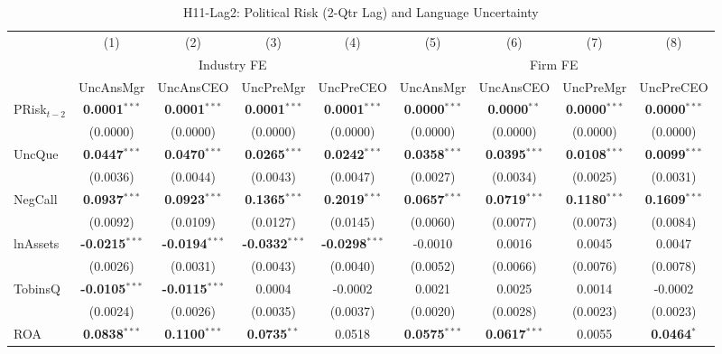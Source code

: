 \documentclass[11pt,a4paper]{article}
\begin{document}
\clearpage
\begin{table}[htbp]
\centering
\caption{H11-Lag2: Political Risk (2-Qtr Lag) and Language Uncertainty}
\label{tab:h11_lag2}
\scriptsize
\begin{tabular}{lcccccccc}
\toprule
 & (1) & (2) & (3) & (4) & (5) & (6) & (7) & (8) \\
 & \multicolumn{4}{c}{Industry FE} & \multicolumn{4}{c}{Firm FE} \\
\cmidrule(lr){2-5} \cmidrule(lr){6-9}
 & UncAnsMgr & UncAnsCEO & UncPreMgr & UncPreCEO & UncAnsMgr & UncAnsCEO & UncPreMgr & UncPreCEO \\
\midrule
PRisk$_{t-2}$ & \textbf{0.0001}$^{***}$ & \textbf{0.0001}$^{***}$ & \textbf{0.0001}$^{***}$ & \textbf{0.0001}$^{***}$ & \textbf{0.0000}$^{***}$ & \textbf{0.0000}$^{**}$ & \textbf{0.0000}$^{***}$ & \textbf{0.0000}$^{***}$ \\
 & (0.0000) & (0.0000) & (0.0000) & (0.0000) & (0.0000) & (0.0000) & (0.0000) & (0.0000) \\
\midrule
UncQue & \textbf{0.0447}$^{***}$ & \textbf{0.0470}$^{***}$ & \textbf{0.0265}$^{***}$ & \textbf{0.0242}$^{***}$ & \textbf{0.0358}$^{***}$ & \textbf{0.0395}$^{***}$ & \textbf{0.0108}$^{***}$ & \textbf{0.0099}$^{***}$ \\
 & (0.0036) & (0.0044) & (0.0043) & (0.0047) & (0.0027) & (0.0034) & (0.0025) & (0.0031) \\
NegCall & \textbf{0.0937}$^{***}$ & \textbf{0.0923}$^{***}$ & \textbf{0.1365}$^{***}$ & \textbf{0.2019}$^{***}$ & \textbf{0.0657}$^{***}$ & \textbf{0.0719}$^{***}$ & \textbf{0.1180}$^{***}$ & \textbf{0.1609}$^{***}$ \\
 & (0.0092) & (0.0109) & (0.0127) & (0.0145) & (0.0060) & (0.0077) & (0.0073) & (0.0084) \\
lnAssets & \textbf{-0.0215}$^{***}$ & \textbf{-0.0194}$^{***}$ & \textbf{-0.0332}$^{***}$ & \textbf{-0.0298}$^{***}$ & -0.0010 & 0.0016 & 0.0045 & 0.0047 \\
 & (0.0026) & (0.0031) & (0.0043) & (0.0040) & (0.0052) & (0.0066) & (0.0076) & (0.0078) \\
TobinsQ & \textbf{-0.0105}$^{***}$ & \textbf{-0.0115}$^{***}$ & 0.0004 & -0.0002 & 0.0021 & 0.0025 & 0.0014 & -0.0002 \\
 & (0.0024) & (0.0026) & (0.0035) & (0.0037) & (0.0020) & (0.0028) & (0.0023) & (0.0023) \\
ROA & \textbf{0.0838}$^{***}$ & \textbf{0.1100}$^{***}$ & \textbf{0.0735}$^{**}$ & 0.0518 & \textbf{0.0575}$^{***}$ & \textbf{0.0617}$^{***}$ & 0.0055 & \textbf{0.0464}$^{*}$ \\

\end{tabular}
\end{table}
\end{document}
